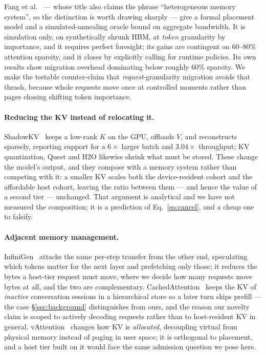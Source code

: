 Fang et al.~\cite{calkv} --- whose title also claims the phrase ``heterogeneous
memory system'', so the distinction is worth drawing sharply --- give a formal
placement model and a
simulated-annealing oracle bound on aggregate bandwidth. It is simulation only,
on synthetically shrunk HBM, at \emph{token} granularity by importance, and it
requires perfect foresight; its gains are contingent on 60--80\% attention
sparsity, and it closes by explicitly calling for runtime policies. Its own
results show migration overhead dominating below roughly 60\% sparsity. We
make the testable counter-claim that \emph{request}-granularity migration
avoids that thrash, because whole requests move once at controlled moments
rather than pages chasing shifting token importance.

\paragraph{Reducing the KV instead of relocating it.} ShadowKV~\cite{shadowkv}
keeps a low-rank $K$ on the GPU, offloads $V$, and reconstructs sparsely,
reporting support for a $6\times$ larger batch and $3.04\times$ throughput; KV
quantization, Quest and H2O likewise shrink what must be stored. These change
the model's output, and they compose with a memory system rather than competing
with it: a smaller KV scales both the device-resident cohort and the affordable
host cohort, leaving the ratio between them --- and hence the value of a second
tier --- unchanged. That argument is analytical and we have not measured the
composition; it is a prediction of Eq.~\ref{eq:cancel}, and a cheap one to
falsify.


\paragraph{Adjacent memory management.}
InfiniGen~\cite{infinigen} attacks the same per-step transfer from the other
end, speculating which tokens matter for the next layer and prefetching only
those; it reduces the bytes a host-tier request must move, where we decide how
many requests move bytes at all, and the two are complementary.
CachedAttention~\cite{cachedattention} keeps the KV of \emph{inactive}
conversation sessions in a hierarchical store so a later turn skips prefill ---
the case \S\ref{sec:background} distinguishes from ours, and the reason our
novelty claim is scoped to actively decoding requests rather than to
host-resident KV in general. vAttention~\cite{vattention} changes how KV is
\emph{allocated}, decoupling virtual from physical memory instead of paging in
user space; it is orthogonal to placement, and a host tier built on it would
face the same admission question we pose here.



